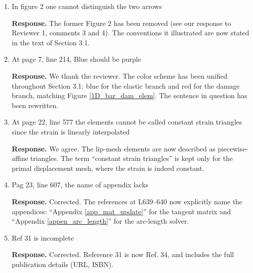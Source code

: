 \documentclass[10pt]{article}
\begin{document}
\begin{enumerate}
\item In figure 2 one cannot distinguish the two arrows

\color{blue}
\textbf{Response.} The former Figure 2 has been removed (see our response to Reviewer 1, comments 3 and 4). The conventions it illustrated are now stated in the text of Section 3.1.
\color{black}

\item At page 7, line 214, Blue should be purple

\color{blue}

\textbf{Response.} We thank the reviewer. The color scheme has been unified throughout Section 3.1: blue for the elastic branch and red for the damage branch, matching Figure \ref{1D_bar_dam_elem}. The sentence in question has been rewritten.

\color{black}
\item At page 22, line 577 the elements cannot be called constant strain triangles since the strain is linearly interpolated

\color{blue}

\textbf{Response.} We agree. The lip-mesh elements are now described as piecewise-affine triangles. The term ``constant strain triangles'' is kept only for the primal displacement mesh, where the strain is indeed constant.


\color{black}
\item Pag 23, line 607, the name of appendix lacks

\color{blue}

\textbf{Response.} Corrected. The references at L639--640 now explicitly name the appendices: ``Appendix \ref{app_mat_update}'' for the tangent matrix and ``Appendix \ref{appen_arc_length}'' for the arc-length solver.


\color{black}
\item Ref 31 is incomplete

\color{blue}

\textbf{Response.} Corrected. Reference 31 is now Ref. 34, and includes the full publication details (URL, ISBN).


\color{black}
\end{enumerate}

\printbibliography
\end{document}
